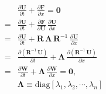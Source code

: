 \documentclass[10pt]{article}
\begin{document}
\begin{align*}&\frac{\partial\boldsymbol{U}}{\partial t}+\frac{\partial\boldsymbol{F}}{\partial x}=\boldsymbol{0}\\
=&\frac{\partial\boldsymbol{U}}{\partial t}+\frac{\partial\boldsymbol{F}}{\partial\boldsymbol{U}}\,\frac{\partial\boldsymbol{U}}{\partial x}\\
=&\frac{\partial\boldsymbol{U}}{\partial t}+\boldsymbol{R\,\Lambda\, R}^{-1}\,\frac{\partial\boldsymbol{U}}{\partial x}\\
=&\frac{\partial\left(\boldsymbol{R}^{-1}\,\boldsymbol{U}\right)}{\partial t}+\boldsymbol{\Lambda}\,\frac{\partial\left(\boldsymbol{R}^{-1}\,\boldsymbol{U}\right)}{\partial x}\\
=&\frac{\partial\boldsymbol{W}}{\partial t}+\boldsymbol{\Lambda}\,\frac{\partial\boldsymbol{W}}{\partial x}=\boldsymbol{0},\\
&\boldsymbol{\Lambda}\equiv\text{diag}\left[\lambda_{1},\lambda_{2},\cdots,\lambda_{n}\right]\end{align*}
\end{document}
